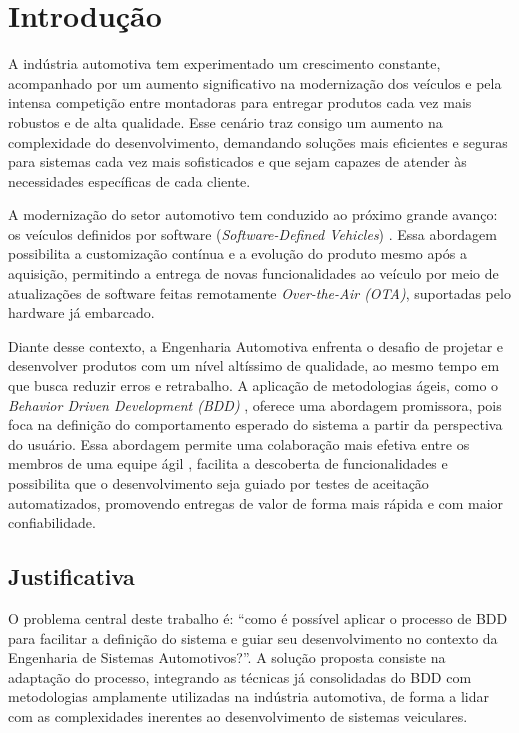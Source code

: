 \chapter{Introdução}

A indústria automotiva tem experimentado um crescimento constante, acompanhado por um aumento significativo na modernização dos veículos e pela intensa competição entre 
montadoras para entregar produtos cada vez mais robustos e de alta qualidade. Esse cenário traz consigo um aumento na complexidade do desenvolvimento, demandando soluções 
mais eficientes e seguras para sistemas cada vez mais sofisticados e que sejam capazes de atender às necessidades específicas de cada cliente.

A modernização do setor automotivo tem conduzido ao próximo grande avanço: os veículos definidos por software (\textit{Software-Defined Vehicles}) 
\cite{softwareVehicles2025}. Essa abordagem possibilita a customização contínua e a evolução do produto mesmo após a aquisição, permitindo a entrega de novas 
funcionalidades ao veículo por meio de atualizações de software feitas remotamente \textit{Over-the-Air (OTA)}, suportadas pelo hardware já embarcado.

Diante desse contexto, a Engenharia Automotiva enfrenta o desafio de projetar e desenvolver produtos com um nível altíssimo de qualidade, ao mesmo tempo em que busca reduzir 
erros e retrabalho. A aplicação de metodologias ágeis, como o \textit{Behavior Driven Development (BDD)} \cite{north2006bdd}, oferece uma abordagem promissora, pois foca na 
definição do comportamento esperado do sistema a partir da perspectiva do usuário. Essa abordagem permite uma colaboração mais efetiva entre os membros de uma equipe ágil 
\cite{atlassianAgileTeams}, facilita a descoberta de funcionalidades e possibilita que o desenvolvimento seja guiado por testes de aceitação automatizados, promovendo 
entregas de valor de forma mais rápida e com maior confiabilidade.

\section{\textbf{Justificativa}}

O problema central deste trabalho é: “como é possível aplicar o processo de BDD para facilitar a definição do sistema e guiar seu desenvolvimento no contexto da 
Engenharia de Sistemas Automotivos?”. A solução proposta consiste na adaptação do processo, integrando as técnicas já consolidadas do BDD com metodologias 
amplamente utilizadas na indústria automotiva, de forma a lidar com as complexidades inerentes ao desenvolvimento de sistemas veiculares.

